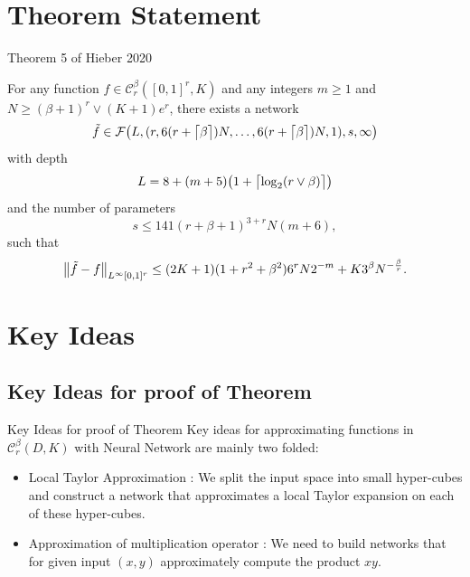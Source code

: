 \documentclass{if-beamer}
\DeclarePairedDelimiter{\ceil}{\lceil}{\rceil}
\begin{document}
\section{Theorem Statement}
\begin{frame}{Theorem 5 of Hieber 2020}
\begin{tcolorbox}
    For any function $f\in\mathcal{C}_{r}^{\beta}([0,1]^{r},K)$ and any integers $m\geq 1$ and $N\geq(\beta+1)^{r} \vee (K+1)e^{r}$, there exists a network 
    \begin{equation*}
        \Tilde{f}\in\mathcal{F}\big(L,(r,6(r+\ceil[\big]{\beta})N,\dots,6(r+\ceil[\big]{\beta})N,1),s,\infty\big)
    \end{equation*}
    with depth
    \begin{equation*}
        L=8+(m+5)\big(1+\ceil[\big]{\log_{2}(r\vee\beta)}\big)
    \end{equation*}
    and the number of parameters 
    \begin{equation*}
        s\leq 141(r+\beta+1)^{3+r}N(m+6),
    \end{equation*}
    such that
    \begin{equation*}
        \left\|\Tilde{f}-f\right\|_{L^\infty[0,1]^{r}}\leq (2K+1)(1+r^{2}+\beta^{2})6^{r}N2^{-m}+K3^{\beta}N^{-\frac{\beta}{r}}.
    \end{equation*}
\end{tcolorbox}
\end{frame}

\section{Key Ideas}
\subsection{Key Ideas for proof of Theorem}
\begin{frame}{Key Ideas for proof of Theorem}
    Key ideas for approximating functions in $\mathcal{C}_{r}^{\beta}(D,K)$ with Neural Network are mainly two folded:
    \begin{itemize}
        \item Local Taylor Approximation : We split the input space into small hyper-cubes and construct a network that approximates a local Taylor expansion on each of these hyper-cubes.
        \item Approximation of multiplication operator : We need to build networks that for given input $(x,y)$ approximately compute the product $xy$. 
    \end{itemize}
\end{frame}
\end{document}
